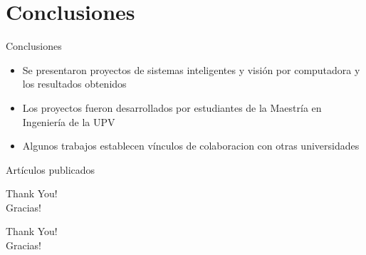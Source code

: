 \documentclass[aspectratio=169,compress]{beamer}
\begin{document}
\section{Conclusiones}
\begin{frame}{Conclusiones}
\begin{itemize}
\item Se presentaron proyectos de sistemas inteligentes y visión por computadora y los resultados obtenidos
\item Los proyectos fueron desarrollados por estudiantes de la Maestría en Ingeniería de la UPV
\item Algunos trabajos establecen vínculos de colaboracion con otras universidades
\end{itemize}
\end{frame}




\renewcommand*{\bibfont}{\tiny}
\begin{frame}[allowframebreaks]{Artículos publicados}
    \printbibliography[title=Artículos publicados,keyword=primary]
\end{frame}

\begin{frame}%
\begin{center}
\Huge Thank You! \\
\Huge Gracias! \\
\end{center}
\end{frame}

\begin{frame}%
\begin{center}
{\fontsize{40}{50}\selectfont Thank You!}\\
{\fontsize{40}{50}\selectfont Gracias!}
\end{center}
\end{frame}
\end{document}

